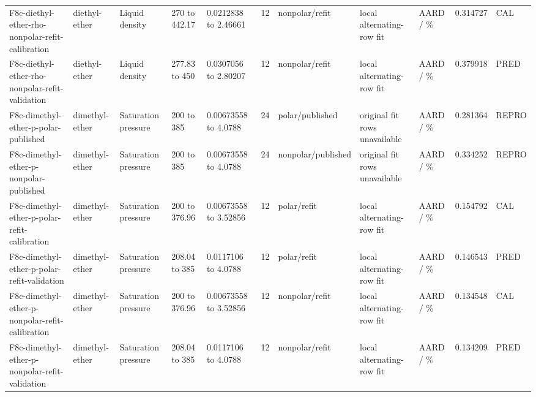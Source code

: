 \begin{landscape}
\begin{longtable}{L{1.9cm}L{2.5cm}L{2.1cm}L{1.6cm}L{1.6cm}rL{2.4cm}L{1.9cm}L{2.2cm}rL{1cm}}
F8c-\allowbreak{}diethyl-\allowbreak{}ether-\allowbreak{}rho-\allowbreak{}nonpolar-\allowbreak{}refit-\allowbreak{}calibration & diethyl-\allowbreak{}ether & Liquid density & 270 to 442.17 & 0.0212838 to 2.46661 & 12 & nonpolar/\allowbreak{}refit & local alternating-\allowbreak{}row fit & AARD /\allowbreak{} \% & 0.314727 & CAL \\
F8c-\allowbreak{}diethyl-\allowbreak{}ether-\allowbreak{}rho-\allowbreak{}nonpolar-\allowbreak{}refit-\allowbreak{}validation & diethyl-\allowbreak{}ether & Liquid density & 277.83 to 450 & 0.0307056 to 2.80207 & 12 & nonpolar/\allowbreak{}refit & local alternating-\allowbreak{}row fit & AARD /\allowbreak{} \% & 0.379918 & PRED \\
F8c-\allowbreak{}dimethyl-\allowbreak{}ether-\allowbreak{}p-\allowbreak{}polar-\allowbreak{}published & dimethyl-\allowbreak{}ether & Saturation pressure & 200 to 385 & 0.00673558 to 4.0788 & 24 & polar/\allowbreak{}published & original fit rows unavailable & AARD /\allowbreak{} \% & 0.281364 & REPRO \\
F8c-\allowbreak{}dimethyl-\allowbreak{}ether-\allowbreak{}p-\allowbreak{}nonpolar-\allowbreak{}published & dimethyl-\allowbreak{}ether & Saturation pressure & 200 to 385 & 0.00673558 to 4.0788 & 24 & nonpolar/\allowbreak{}published & original fit rows unavailable & AARD /\allowbreak{} \% & 0.334252 & REPRO \\
F8c-\allowbreak{}dimethyl-\allowbreak{}ether-\allowbreak{}p-\allowbreak{}polar-\allowbreak{}refit-\allowbreak{}calibration & dimethyl-\allowbreak{}ether & Saturation pressure & 200 to 376.96 & 0.00673558 to 3.52856 & 12 & polar/\allowbreak{}refit & local alternating-\allowbreak{}row fit & AARD /\allowbreak{} \% & 0.154792 & CAL \\
F8c-\allowbreak{}dimethyl-\allowbreak{}ether-\allowbreak{}p-\allowbreak{}polar-\allowbreak{}refit-\allowbreak{}validation & dimethyl-\allowbreak{}ether & Saturation pressure & 208.04 to 385 & 0.0117106 to 4.0788 & 12 & polar/\allowbreak{}refit & local alternating-\allowbreak{}row fit & AARD /\allowbreak{} \% & 0.146543 & PRED \\
F8c-\allowbreak{}dimethyl-\allowbreak{}ether-\allowbreak{}p-\allowbreak{}nonpolar-\allowbreak{}refit-\allowbreak{}calibration & dimethyl-\allowbreak{}ether & Saturation pressure & 200 to 376.96 & 0.00673558 to 3.52856 & 12 & nonpolar/\allowbreak{}refit & local alternating-\allowbreak{}row fit & AARD /\allowbreak{} \% & 0.134548 & CAL \\
F8c-\allowbreak{}dimethyl-\allowbreak{}ether-\allowbreak{}p-\allowbreak{}nonpolar-\allowbreak{}refit-\allowbreak{}validation & dimethyl-\allowbreak{}ether & Saturation pressure & 208.04 to 385 & 0.0117106 to 4.0788 & 12 & nonpolar/\allowbreak{}refit & local alternating-\allowbreak{}row fit & AARD /\allowbreak{} \% & 0.134209 & PRED \\

\end{longtable}
\end{landscape}

